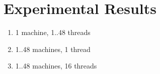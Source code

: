 \chapter{Experimental Results}

\begin{enumerate}
\item 1 machine, 1..48 threads

\item 1..48 machines, 1 thread

\item 1..48 machines, 16 threads

\end{enumerate}

